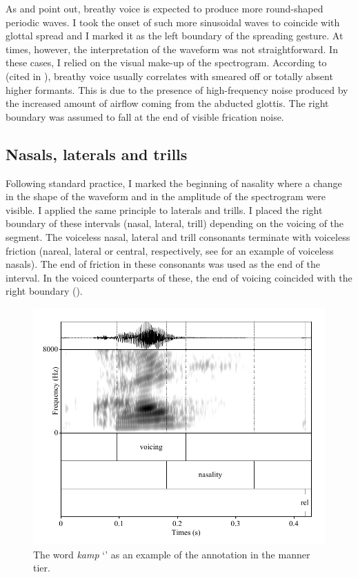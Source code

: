 \documentclass[11pt,a4paper,openany]{memoir}\usepackage[]{graphicx}\usepackage[]{color}
\begin{document}
As \citet{khan2012} and \citet{nance2013} point out, breathy voice is expected to produce more round-shaped periodic waves.
I took the onset of such more sinusoidal waves to coincide with glottal spread and I marked it as the left boundary of the spreading gesture.
At times, however, the interpretation of the waveform was not straightforward.
In these cases, I relied on the visual make-up of the spectrogram.
According to \citealt{jones2006} (cited in \citealt[134]{nance2013}), breathy voice usually correlates with smeared off or totally absent higher formants.
This is due to the presence of high-frequency noise produced by the increased amount of airflow coming from the abducted glottis.
The right boundary was assumed to fall at the end of visible frication noise.

\subsection{Nasals, laterals and trills}

Following standard practice, I marked the beginning of nasality where a change in the shape of the waveform and in the amplitude of the spectrogram were visible.
I applied the same principle to laterals and trills.
I placed the right boundary of these intervals (nasal, lateral, trill) depending on the voicing of the segment.
The voiceless nasal, lateral and trill consonants terminate with voiceless friction (nareal, lateral or central, respectively, see  for an example of voiceless nasals).
The end of friction in these consonants was used as the end of the interval.
In the voiced counterparts of these, the end of voicing coincided with the right boundary ().

\begin{figure}
\centering
\includegraphics[width=\textwidth]{kamp}
\caption{The word \textit{kamp} `' as an example of the annotation in the manner tier.}
\label{f:kamp}
\end{figure}
\end{document}
